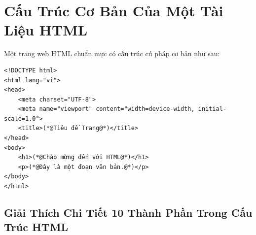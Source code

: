 \documentclass[11pt,oneside]{book}
\begin{document}
\section{Cấu Trúc Cơ Bản Của Một Tài Liệu HTML}

Một trang web HTML chuẩn mực có cấu trúc cú pháp cơ bản như sau:

\begin{codeWindow}
\begin{lstlisting}[language=HTML5]
<!DOCTYPE html>
<html lang="vi">
<head>
    <meta charset="UTF-8">
    <meta name="viewport" content="width=device-width, initial-scale=1.0">
    <title>(*@Tiêu đề Trang@*)</title>
</head>
<body>
    <h1>(*@Chào mừng đến với HTML@*)</h1>
    <p>(*@Đây là một đoạn văn bản.@*)</p>
</body>
</html>
\end{lstlisting}
\end{codeWindow}

\subsection{Giải Thích Chi Tiết 10 Thành Phần Trong Cấu Trúc HTML}
\end{document}
